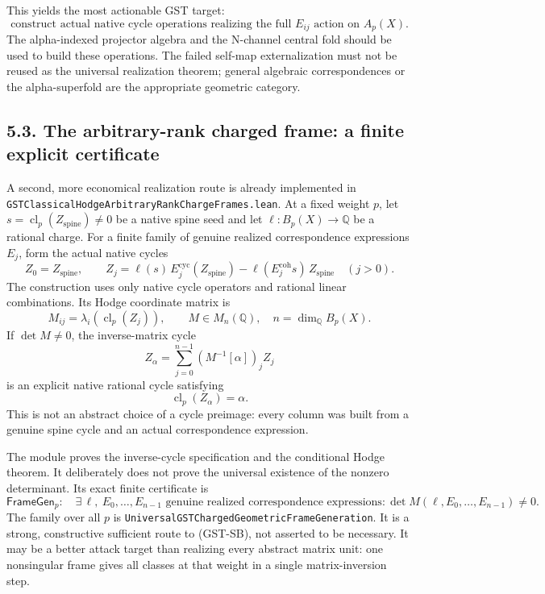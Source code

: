 This yields the most actionable GST target:
\[
\text{construct actual native cycle operations realizing the full }E_{ij}
\text{ action on }A_p(X).
\]
The alpha-indexed projector algebra and the N-channel central fold should be used to build these operations. The failed self-map externalization must not be reused as the universal realization theorem; general algebraic correspondences or the alpha-superfold are the appropriate geometric category.

\subsection*{5.3. The arbitrary-rank charged frame: a finite explicit certificate}

A second, more economical realization route is already implemented in
\texttt{GSTClassicalHodgeArbitraryRankChargeFrames.lean}. At a fixed weight
\(p\), let \(s=\operatorname{cl}_p(Z_{\mathrm{spine}})\ne0\) be a native
spine seed and let \(\ell:B_p(X)\to\mathbb Q\) be a rational charge. For a
finite family of genuine realized correspondence expressions \(E_j\), form
the actual native cycles
\[
Z_0=Z_{\mathrm{spine}},\qquad
Z_j=
\ell(s)\,E_j^{\mathrm{cyc}}(Z_{\mathrm{spine}})
-\ell(E_j^{\mathrm{coh}}s)\,Z_{\mathrm{spine}}
\quad(j>0).
\]
The construction uses only native cycle operators and rational linear
combinations. Its Hodge coordinate matrix is
\[
M_{ij}=\lambda_i(\operatorname{cl}_p(Z_j)),
\qquad
M\in M_n(\mathbb Q),\quad n=\dim_{\mathbb Q}B_p(X).
\]
If \(\det M\ne0\), the inverse-matrix cycle
\[
Z_\alpha=\sum_{j=0}^{n-1}(M^{-1}[\alpha])_jZ_j
\]
is an explicit native rational cycle satisfying
\[
\operatorname{cl}_p(Z_\alpha)=\alpha.
\]
This is not an abstract choice of a cycle preimage: every column was built
from a genuine spine cycle and an actual correspondence expression.

The module proves the inverse-cycle specification and the conditional
Hodge theorem. It deliberately does not prove the universal existence of
the nonzero determinant. Its exact finite certificate is
\[
\mathsf{FrameGen}_p:
\quad
\exists\,\ell,\ E_0,\ldots,E_{n-1}
\text{ genuine realized correspondence expressions}:
\det M(\ell,E_0,\ldots,E_{n-1})\ne0.
\]
The family over all \(p\) is
\texttt{UniversalGSTChargedGeometricFrameGeneration}. It is a strong,
constructive sufficient route to (GST-SB), not asserted to be necessary.
It may be a better attack target than realizing every abstract matrix unit:
one nonsingular frame gives all classes at that weight in a single
matrix-inversion step.

